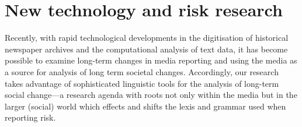 \documentclass{report}
\begin{document}

\section{New technology and risk research}


Recently, with rapid technological developments in the digitisation of historical newspaper archives and the computational analysis of text data, it has become possible to examine long-term changes in media reporting and using the media as a source for analysis of long term societal changes. Accordingly, our research takes advantage of sophisticated linguistic tools for the analysis of long-term social change---a research agenda with roots not only within the media but in the larger (social) world which effects and shifts the lexis and grammar used when reporting risk.

\end{document}
